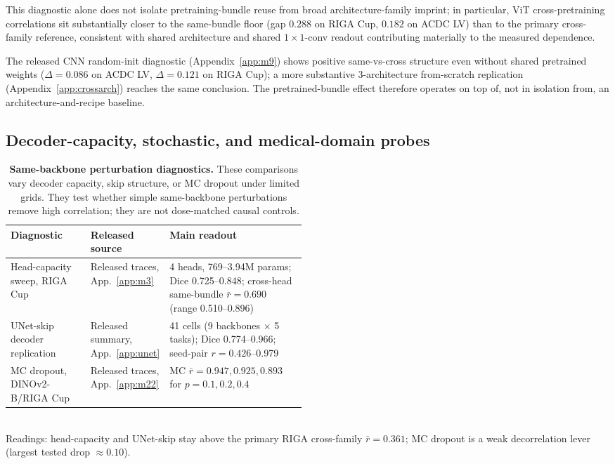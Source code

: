 \documentclass{article}
\begin{document}
This diagnostic alone does not isolate pretraining-bundle reuse from broad architecture-family imprint; in particular, ViT cross-pretraining correlations sit substantially closer to the same-bundle floor (gap $0.288$ on RIGA Cup, $0.182$ on ACDC LV) than to the primary cross-family reference, consistent with shared architecture and shared $1\times1$-conv readout contributing materially to the measured dependence.

The released CNN random-init diagnostic (Appendix~\ref{app:m9}) shows positive same-vs-cross structure even without shared pretrained weights ($\Delta=0.086$ on ACDC LV, $\Delta=0.121$ on RIGA Cup); a more substantive 3-architecture from-scratch replication (Appendix~\ref{app:crossarch}) reaches the same conclusion. The pretrained-bundle effect therefore operates on top of, not in isolation from, an architecture-and-recipe baseline.

\subsection{Decoder-capacity, stochastic, and medical-domain probes}
\label{sec:samebb-probes}

\begin{table}[t]
  \caption{\textbf{Same-backbone perturbation diagnostics.} These comparisons vary decoder capacity, skip structure, or MC dropout under limited grids. They test whether simple same-backbone perturbations remove high correlation; they are not dose-matched causal controls.}
  \label{tab:controls}
  \centering\footnotesize
  \setlength{\tabcolsep}{4pt}
  \begin{tabularx}{\linewidth}{p{0.27\linewidth}p{0.22\linewidth}Y}
    \toprule
    Diagnostic & Released source & Main readout \\
    \midrule
    Head-capacity sweep, RIGA Cup & Released traces, App.~\ref{app:m3} & 4 heads, 769--3.94M params; Dice 0.725--0.848; cross-head same-bundle $\bar r{=}0.690$ (range 0.510--0.896) \\
    UNet-skip decoder replication & Released summary, App.~\ref{app:unet} & 41 cells (9 backbones $\times$ 5 tasks); Dice 0.774--0.966; seed-pair $r{=}0.426$--0.979 \\
    MC dropout, DINOv2-B/RIGA Cup & Released traces, App.~\ref{app:m22} & MC $\bar r{=}0.947,0.925,0.893$ for $p{=}0.1,0.2,0.4$ \\
    \bottomrule
  \end{tabularx}
  \\[2pt]
  {\footnotesize Readings: head-capacity and UNet-skip stay above the primary RIGA cross-family $\bar r{=}0.361$; MC dropout is a weak decorrelation lever (largest tested drop ${\approx}0.10$).}
\end{table}
\end{document}
